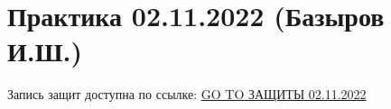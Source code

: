 \documentclass[main.tex]{subfiles}
\begin{document}

\section{Практика 02.11.2022 (Базыров И.Ш.)}

Запись защит доступна по ссылке: \href{https://disk.yandex.ru/d/HeQUisnwV0K5EQ/\%D0\%92\%D1\%82\%D0\%BE\%D1\%80\%D0\%BE\%D0\%B9\%20\%D0\%BA\%D1\%83\%D1\%80\%D1\%81\%20\%D0\%BC\%D0\%B0\%D0\%B3\%D0\%B8\%D1\%81\%D1\%82\%D1\%80\%D0\%B0\%D1\%82\%D1\%83\%D1\%80\%D1\%8B/\%D0\%93\%D0\%B8\%D0\%B4\%D1\%80\%D0\%BE\%D0\%B4\%D0\%B8\%D0\%BD\%D0\%B0\%D0\%BC\%D0\%B8\%D1\%87\%D0\%B5\%D1\%81\%D0\%BA\%D0\%BE\%D0\%B5\%20\%D0\%BC\%D0\%BE\%D0\%B4\%D0\%B5\%D0\%BB\%D0\%B8\%D1\%80\%D0\%BE\%D0\%B2\%D0\%B0\%D0\%BD\%D0\%B8\%D0\%B5/2022_11_02_\%D0\%93\%D0\%94\%D0\%9C_\%D0\%B7\%D0\%B0\%D1\%89\%D0\%B8\%D1\%82\%D1\%8B3.mp4}{GO TO ЗАЩИТЫ 02.11.2022}
\end{document}
